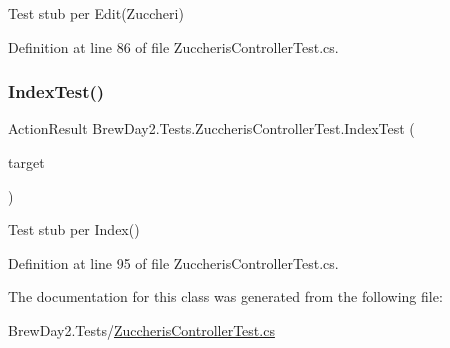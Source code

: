 Test stub per Edit(\+Zuccheri)



Definition at line 86 of file Zuccheris\+Controller\+Test.\+cs.

\mbox{\label{class_brew_day2_1_1_tests_1_1_zuccheris_controller_test_a883cece545ef2be30f3b7b912bb2e2cc}} 
\subsubsection{\texorpdfstring{Index\+Test()}{IndexTest()}}
{\footnotesize\ttfamily Action\+Result Brew\+Day2.\+Tests.\+Zuccheris\+Controller\+Test.\+Index\+Test (\begin{DoxyParamCaption}\item[{\mbox{[}\+Pex\+Assume\+Under\+Test\mbox{]} \mbox{\hyperlink{class_brew_day2_1_1_controllers_1_1_zuccheris_controller}{Zuccheris\+Controller}}}]{target }\end{DoxyParamCaption})}



Test stub per Index()



Definition at line 95 of file Zuccheris\+Controller\+Test.\+cs.



The documentation for this class was generated from the following file\+:\begin{DoxyCompactItemize}
\item 
Brew\+Day2.\+Tests/\mbox{\hyperlink{_zuccheris_controller_test_8cs}{Zuccheris\+Controller\+Test.\+cs}}\end{DoxyCompactItemize}
